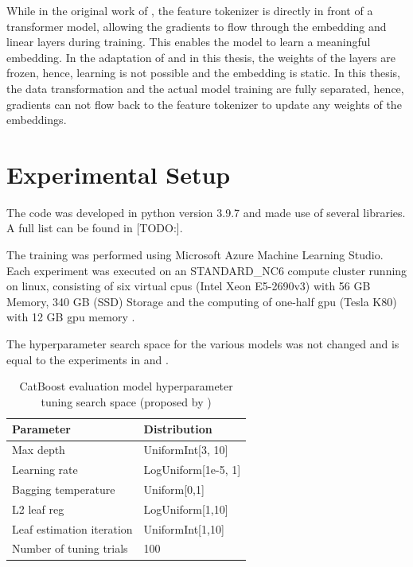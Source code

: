 While in the original work of \cite{gorishniy2021RevisitingDeepLearning}, the feature tokenizer is directly in front of a transformer model, allowing the gradients to flow through the embedding and linear layers during training.
This enables the model to learn a meaningful embedding.
In the adaptation of \cite{2023DiffusionModelsMissing} and in this thesis, the weights of the layers are frozen, hence, learning is not possible and the embedding is static.
In this thesis, the data transformation and the actual model training are fully separated, hence, gradients can not flow back to the feature tokenizer to update any weights of the embeddings.


\section{Experimental Setup}
\label{ch:methods-experimentalSetup}

The code was developed in python version 3.9.7 and made use of several libraries.
A full list can be found in [TODO:].

The training was performed using Microsoft Azure Machine Learning Studio.
Each experiment was executed on an STANDARD_NC6 compute cluster running on linux, consisting of six virtual \glspl{cpu} (Intel Xeon E5-2690v3) with 56 GB Memory, 340 GB (SSD) Storage and the computing of one-half \gls{gpu} (Tesla K80) with 12 GB \gls{gpu} memory \cite{msft2022NCseriesAzureVirtual}.

The hyperparameter search space for the various models was not changed and is equal to the experiments in \cite{kotelnikov2022TabDDPMModellingTabular} and .
\begin{table}[h]
	\centering
	\begin{tabular}{l | l }
		\hline
		Parameter                 & Distribution        \\
		\hline
		Max depth                 & UniformInt[3, 10]   \\
		Learning rate             & LogUniform[1e-5, 1] \\
		Bagging temperature       & Uniform[0,1]        \\
		L2 leaf reg               & LogUniform[1,10]    \\
		Leaf estimation iteration & UniformInt[1,10]    \\
		\hline
		Number of tuning trials   & 100
	\end{tabular}
	\caption{CatBoost evaluation model hyperparameter tuning search space (proposed by \cite{gorishniy2021RevisitingDeepLearning})}
	\label{tab:catboost_tune}
\end{table}

